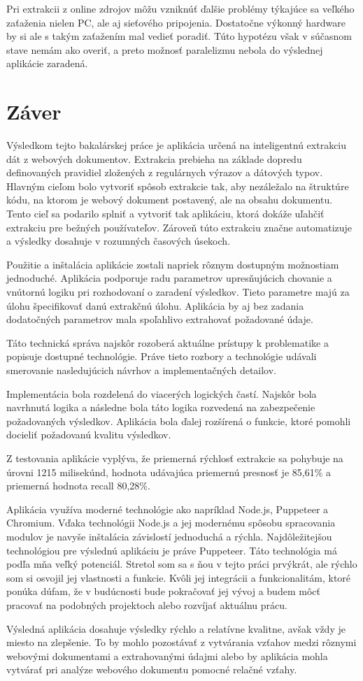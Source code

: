 Pri extrakcii z online zdrojov môžu vzniknúť ďalšie problémy týkajúce sa veľkého zaťaženia nielen PC, ale aj sieťového pripojenia. Dostatočne výkonný hardware by si ale s takým zaťažením mal vedieť poradiť. Túto hypotézu však v súčasnom stave nemám ako overiť, a preto možnosť paralelizmu nebola do výslednej aplikácie zaradená.


\chapter{Záver}

Výsledkom tejto bakalárskej práce je aplikácia určená na inteligentnú extrakciu dát z webových dokumentov. Extrakcia prebieha na základe dopredu definovaných pravidiel zložených z regulárnych výrazov a dátových typov. Hlavným cieľom bolo vytvoriť spôsob extrakcie tak, aby nezáležalo na štruktúre kódu, na ktorom je webový dokument postavený, ale na obsahu dokumentu. Tento cieľ sa podarilo splniť a vytvoriť tak aplikáciu, ktorá dokáže uľahčiť extrakciu pre bežných používateľov. Zároveň túto extrakciu značne automatizuje a výsledky dosahuje v rozumných časových úsekoch.

Použitie a inštalácia aplikácie zostali napriek rôznym dostupným možnostiam jednoduché. Aplikácia podporuje radu parametrov upresňujúcich chovanie a vnútornú logiku pri rozhodovaní o zaradení výsledkov. Tieto parametre majú za úlohu špecifikovať danú extrakčnú úlohu. Aplikácia by aj bez zadania dodatočných parametrov mala spoľahlivo extrahovať požadované údaje.

Táto technická správa najskôr rozoberá aktuálne prístupy k problematike a popisuje dostupné technológie. Práve tieto rozbory a technológie udávali smerovanie nasledujúcich návrhov a implementačných detailov. 

Implementácia bola rozdelená do viacerých logických častí. Najskôr bola navrhnutá logika a následne bola táto logika rozvedená na zabezpečenie požadovaných výsledkov. Aplikácia bola ďalej rozšírená o funkcie, ktoré pomohli docieliť požadovanú kvalitu výsledkov.

Z testovania aplikácie vyplýva, že priemerná rýchlosť extrakcie sa pohybuje na úrovni 1215 milisekúnd, hodnota udávajúca priemernú presnosť je 85,61\% a priemerná hodnota recall 80,28\%. 

Aplikácia využíva moderné technológie ako napríklad Node.js, Puppeteer a Chromium. Vďaka technológii Node.js a jej modernému spôsobu spracovania modulov je navyše inštalácia závislostí jednoduchá a rýchla. Najdôležitejšou technológiou pre výslednú aplikáciu je práve Puppeteer. Táto technológia má podľa mňa veľký potenciál. Stretol som sa s ňou v tejto práci prvýkrát, ale rýchlo som si osvojil jej vlastnosti a funkcie. Kvôli jej integrácii a funkcionalitám, ktoré ponúka dúfam, že v budúcnosti bude pokračovať jej vývoj a budem môcť pracovať na podobných projektoch alebo rozvíjať aktuálnu prácu.

Výsledná aplikácia dosahuje výsledky rýchlo a relatívne kvalitne, avšak vždy je miesto na zlepšenie. To by mohlo pozostávať z vytvárania vzťahov medzi rôznymi webovými dokumentami a extrahovanými údajmi alebo by aplikácia mohla vytvárať pri analýze webového dokumentu pomocné relačné vzťahy.
